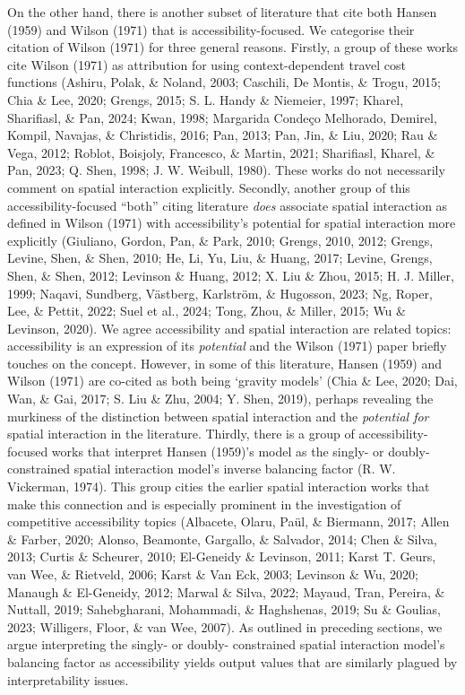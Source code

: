 \documentclass[
11pt, %
oneside, %
english, %
singlespacing, %
]{macthesis} %
\begin{document}
On the other hand, there is another subset of literature that cite both Hansen (1959) and Wilson (1971) that is accessibility-focused. We categorise their citation of Wilson (1971) for three general reasons. Firstly, a group of these works cite Wilson (1971) as attribution for using context-dependent travel cost functions (Ashiru, Polak, \& Noland, 2003; Caschili, De Montis, \& Trogu, 2015; Chia \& Lee, 2020; Grengs, 2015; S. L. Handy \& Niemeier, 1997; Kharel, Sharifiasl, \& Pan, 2024; Kwan, 1998; Margarida Condeço Melhorado, Demirel, Kompil, Navajas, \& Christidis, 2016; Pan, 2013; Pan, Jin, \& Liu, 2020; Rau \& Vega, 2012; Roblot, Boisjoly, Francesco, \& Martin, 2021; Sharifiasl, Kharel, \& Pan, 2023; Q. Shen, 1998; J. W. Weibull, 1980). These works do not necessarily comment on spatial interaction explicitly. Secondly, another group of this accessibility-focused ``both'' citing literature \emph{does} associate spatial interaction as defined in Wilson (1971) with accessibility's potential for spatial interaction more explicitly (Giuliano, Gordon, Pan, \& Park, 2010; Grengs, 2010, 2012; Grengs, Levine, Shen, \& Shen, 2010; He, Li, Yu, Liu, \& Huang, 2017; Levine, Grengs, Shen, \& Shen, 2012; Levinson \& Huang, 2012; X. Liu \& Zhou, 2015; H. J. Miller, 1999; Naqavi, Sundberg, Västberg, Karlström, \& Hugosson, 2023; Ng, Roper, Lee, \& Pettit, 2022; Suel et al., 2024; Tong, Zhou, \& Miller, 2015; Wu \& Levinson, 2020). We agree accessibility and spatial interaction are related topics: accessibility is an expression of its \emph{potential} and the Wilson (1971) paper briefly touches on the concept. However, in some of this literature, Hansen (1959) and Wilson (1971) are co-cited as both being `gravity models' (Chia \& Lee, 2020; Dai, Wan, \& Gai, 2017; S. Liu \& Zhu, 2004; Y. Shen, 2019), perhaps revealing the murkiness of the distinction between spatial interaction and the \emph{potential for} spatial interaction in the literature. Thirdly, there is a group of accessibility-focused works that interpret Hansen (1959)'s model as the singly- or doubly- constrained spatial interaction model's inverse balancing factor (R. W. Vickerman, 1974). This group cities the earlier spatial interaction works that make this connection and is especially prominent in the investigation of competitive accessibility topics (Albacete, Olaru, Paül, \& Biermann, 2017; Allen \& Farber, 2020; Alonso, Beamonte, Gargallo, \& Salvador, 2014; Chen \& Silva, 2013; Curtis \& Scheurer, 2010; El-Geneidy \& Levinson, 2011; Karst T. Geurs, van Wee, \& Rietveld, 2006; Karst \& Van Eck, 2003; Levinson \& Wu, 2020; Manaugh \& El-Geneidy, 2012; Marwal \& Silva, 2022; Mayaud, Tran, Pereira, \& Nuttall, 2019; Sahebgharani, Mohammadi, \& Haghshenas, 2019; Su \& Goulias, 2023; Willigers, Floor, \& van Wee, 2007). As outlined in preceding sections, we argue interpreting the singly- or doubly- constrained spatial interaction model's balancing factor as accessibility yields output values that are similarly plagued by interpretability issues.
\end{document}
